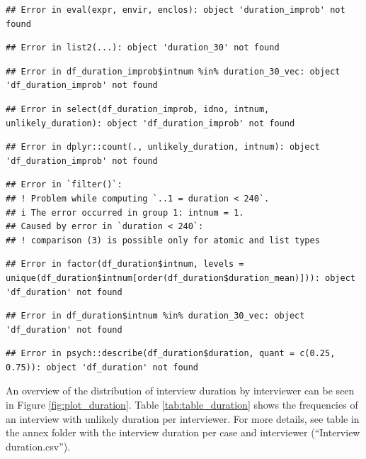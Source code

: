 \documentclass[
  11pt,
  a4paperpaper,
]{article}
\begin{document}
\begin{verbatim}
## Error in eval(expr, envir, enclos): object 'duration_improb' not found
\end{verbatim}

\begin{verbatim}
## Error in list2(...): object 'duration_30' not found
\end{verbatim}

\begin{verbatim}
## Error in df_duration_improb$intnum %in% duration_30_vec: object 'df_duration_improb' not found
\end{verbatim}

\begin{verbatim}
## Error in select(df_duration_improb, idno, intnum, unlikely_duration): object 'df_duration_improb' not found
\end{verbatim}

\begin{verbatim}
## Error in dplyr::count(., unlikely_duration, intnum): object 'df_duration_improb' not found
\end{verbatim}

\begin{verbatim}
## Error in `filter()`:
## ! Problem while computing `..1 = duration < 240`.
## i The error occurred in group 1: intnum = 1.
## Caused by error in `duration < 240`:
## ! comparison (3) is possible only for atomic and list types
\end{verbatim}

\begin{verbatim}
## Error in factor(df_duration$intnum, levels = unique(df_duration$intnum[order(df_duration$duration_mean)])): object 'df_duration' not found
\end{verbatim}

\begin{verbatim}
## Error in df_duration$intnum %in% duration_30_vec: object 'df_duration' not found
\end{verbatim}

\begin{verbatim}
## Error in psych::describe(df_duration$duration, quant = c(0.25, 0.75)): object 'df_duration' not found
\end{verbatim}

An overview of the distribution of interview duration by interviewer can
be seen in Figure \ref{fig:plot_duration}. Table
\ref{tab:table_duration} shows the frequencies of an interview with
unlikely duration per interviewer. For more details, see table in the
annex folder with the interview duration per case and interviewer
(``Interview duration.csv'').
\end{document}
